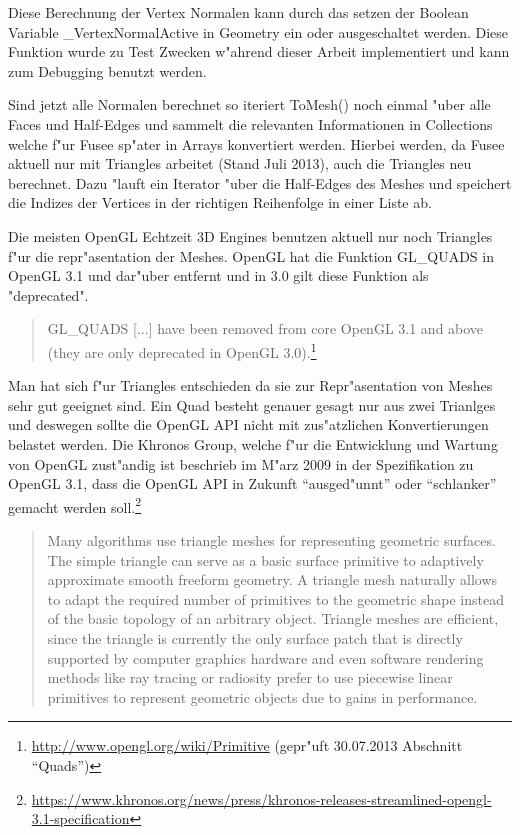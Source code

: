 \documentclass[pagesize, paper=a4, fontsize=12pt,titlepage=true, headings=small, headnosepline, abstractoff, liststotoc, nochapterprefix, plainheadsepline]{scrreprt}
\begin{document}
Diese Berechnung der Vertex Normalen kann durch das setzen der Boolean Variable \_VertexNormalActive in Geometry ein oder ausgeschaltet werden. Diese Funktion wurde zu Test Zwecken w"ahrend dieser Arbeit implementiert und kann zum Debugging benutzt werden.
\newline

Sind jetzt alle Normalen berechnet so iteriert ToMesh() noch einmal "uber alle Faces und Half-Edges und sammelt die relevanten Informationen in Collections welche f"ur Fusee sp"ater in Arrays konvertiert werden. Hierbei werden, da Fusee aktuell nur mit Triangles arbeitet (Stand Juli 2013), auch die Triangles neu berechnet. Dazu "lauft ein Iterator "uber die Half-Edges des Meshes und speichert die Indizes der Vertices in der richtigen Reihenfolge in einer Liste ab.

Die meisten OpenGL Echtzeit 3D Engines benutzen aktuell nur noch Triangles f"ur die repr"asentation der Meshes. OpenGL hat die Funktion GL\_QUADS in OpenGL 3.1 und dar"uber entfernt und in 3.0 gilt diese Funktion als "deprecated".
\begin{quote}GL\_QUADS [...] have been removed from core OpenGL 3.1 and above (they are only deprecated in OpenGL 3.0).\footnote{\url{http://www.opengl.org/wiki/Primitive} (gepr"uft 30.07.2013 Abschnitt "`Quads"')}
\end{quote}

Man hat sich f"ur Triangles entschieden da sie zur Repr"asentation von Meshes sehr gut geeignet sind. Ein Quad besteht genauer gesagt nur aus zwei Trianlges und deswegen sollte die OpenGL API nicht mit zus"atzlichen Konvertierungen belastet werden. Die Khronos Group, welche f"ur die Entwicklung und Wartung von OpenGL zust"andig ist beschrieb im M"arz 2009 in der Spezifikation zu OpenGL 3.1, dass die OpenGL API in Zukunft "`ausged"unnt"' oder "`schlanker"' gemacht werden soll.\footnote{\url{https://www.khronos.org/news/press/khronos-releases-streamlined-opengl-3.1-specification}}

\begin{quote}Many algorithms use triangle meshes for representing geometric surfaces. The simple triangle can serve as a basic surface primitive to adaptively approximate smooth freeform geometry. A triangle mesh naturally allows to adapt the required number of primitives to the geometric shape instead of the basic topology of an arbitrary object. Triangle meshes are efficient, since the triangle is currently the only surface patch that is directly supported by computer graphics hardware and even software rendering methods like ray tracing or radiosity prefer to use piecewise linear primitives to represent geometric objects due to gains in performance. \cite[S.~1]{Campagna.1998}\end{quote}
\end{document}
